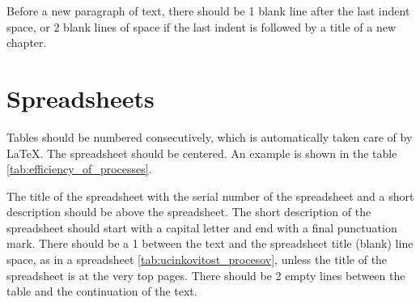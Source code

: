 Before a new paragraph of text, there should be 1 blank line after the last indent
space, or 2 blank lines of space if the last indent is followed by a title
of a new chapter.

\section{Spreadsheets}\label{sec:spreadsheets}

Tables should be numbered consecutively, which is automatically taken care of by \LaTeX.
The spreadsheet should be centered. An example is shown in the table
\ref{tab:efficiency_of_processes}.

The title of the spreadsheet with the serial number of the spreadsheet and a short description should be
above the spreadsheet. The short description of the spreadsheet should start with a capital letter and
end with a final punctuation mark. There should be a 1 between the text and the spreadsheet title
(blank) line space, as in a spreadsheet
\ref{tab:ucinkovitost_procesov}, unless the title of the spreadsheet is at the very top
pages. There should be 2 empty lines between the table and the continuation of the text.

